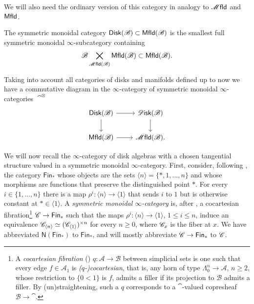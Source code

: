 \documentclass[../text]{subfiles}
\begin{document}
We will also need the ordinary version of this category in analogy to $\mfld$ and $\mfld[r]$.

\begin{definition}
    The symmetric monoidal category $\disk[r](\bstr) \subset \mfld[r](\bstr)$ is the smallest full symmetric monoidal $\infty$-subcategory containing 
    \begin{equation}
        \bstr \bigtimes\limits_{\mfld(\bstr)} \mfld[r](\bstr) \subset \mfld[r](\bstr).
    \end{equation}
\end{definition}

\begin{remark}
    Taking into account all categories of disks and manifolds defined up to now we have a commutative diagram in the $\infty$-category of symmetric monoidal $\infty$-categories $\cat^{\otimes}$
    \begin{equation}
        \begin{tikzcd}
            \disk[r](\bstr) \arrow[r] \arrow[d] & \disk (\bstr) \arrow[d] \\
            \mfld[r] (\bstr) \arrow[r] & \mfld (\bstr).
        \end{tikzcd}
    \end{equation}
\end{remark}

We will now recall the $\infty$-category of disk algebras with a chosen tangential structure valued in a symmetric monoidal $\infty$-category. First, consider, following \cite{lurie_ha}, the category $\mathsf{Fin}_\ast$ whose objects are the sets $\langle n\rangle=\{\ast,1,\dots,n\}$ and whose morphisms are functions that preserve the distinguished point $\ast$. For every $i\in\{1,\dots,n\}$ there is a map $\rho^i\colon\langle n\rangle\to\langle 1\rangle$ that sends $i$ to $1$ but is otherwise constant at $\ast\in\langle1\rangle$. A \emph{symmetric monoidal $\infty$-category} is, after \cite[Definition 2.0.0.7]{lurie_ha}, a cocartesian fibration\footnote{A \emph{cocartesian fibration} (\cite[Definition 01T5]{lurie_kerodon}) $q\colon\mathscr{A}\to\mathscr{B}$ between simplicial sets is one such that every edge $f\in\mathscr{A}_1$ is \emph{($q$-)cocartesian}, that is, any horn of type $\Lambda^n_0\to\mathscr{A}$, $n\geq2$, whose restriction to $\{0<1\}$ is $f$, admits a filler if its projection to $\mathscr{B}$ admits a filler. By (un)straightening, such a $q$ corresponds to a $\cat$-valued copresheaf $\mathscr{B}\to\cat$.} $\mathscr{C}\to\mathsf{Fin}_\ast$ such that the maps $\rho^i\colon\langle n\rangle\to\langle 1\rangle$, $1\leq i\leq n$, induce an equivalence $\mathscr{C}_{\langle n\rangle}\simeq(\mathscr{C}_{\langle 1\rangle})^{\times n}$ for every $n\geq0$, where $\mathscr{C}_{x}$ is the fiber at $x$. We have abbreviated $\mathsf{N}(\mathsf{Fin}_\ast)$ to $\mathsf{Fin}_\ast$, and will mostly abbreviate $\mathscr{C}\to\mathsf{Fin}_\ast$ to $\mathscr{C}$.
\end{document}
